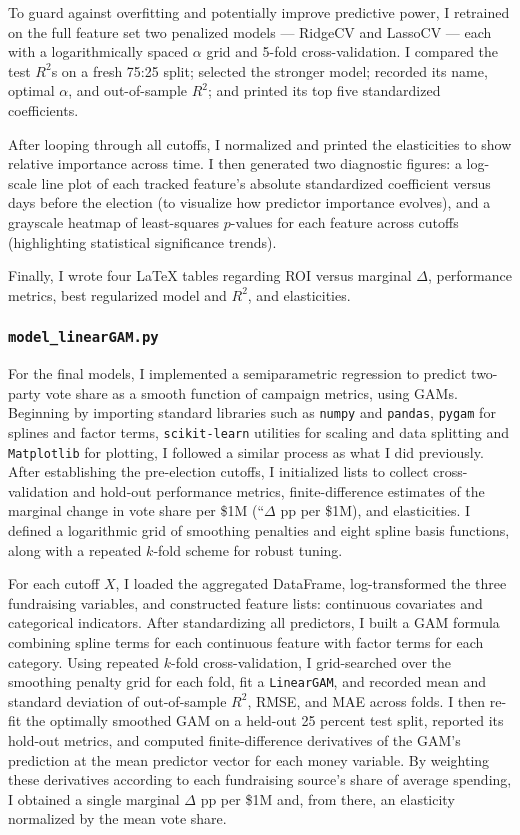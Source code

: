 To guard against overfitting and potentially improve predictive power, I retrained on the full feature set two penalized models --- RidgeCV and LassoCV --- each with a logarithmically spaced $\alpha$ grid and 5-fold cross-validation. I compared the test $R^2$s on a fresh 75:25 split; selected the stronger model; recorded its name, optimal $\alpha$, and out-of-sample $R^2$; and printed its top five standardized coefficients.

After looping through all cutoffs, I normalized and printed the elasticities to show relative importance across time. I then generated two diagnostic figures: a log-scale line plot of each tracked feature's absolute standardized coefficient versus days before the election (to visualize how predictor importance evolves), and a grayscale heatmap of least-squares $p$-values for each feature across cutoffs (highlighting statistical significance trends).

Finally, I wrote four LaTeX tables regarding ROI versus marginal $\Delta$, performance metrics, best regularized model and $R^2$, and elasticities.

\subsubsection*{\tt model\_linearGAM.py}

For the final models, I implemented a semiparametric regression to predict two-party vote share as a smooth function of campaign metrics, using GAMs. Beginning by importing standard libraries such as {\tt numpy} and {\tt pandas}, {\tt pygam} for splines and factor terms, {\tt scikit-learn} utilities for scaling and data splitting and {\tt Matplotlib} for plotting, I followed a similar process as what I did previously. After establishing the pre-election cutoffs, I initialized lists to collect cross-validation and hold-out performance metrics, finite-difference estimates of the marginal change in vote share per \$1M (``$\Delta$ pp per \$1M), and elasticities. I defined a logarithmic grid of smoothing penalties and eight spline basis functions, along with a repeated $k$-fold scheme for robust tuning.

For each cutoff $X$, I loaded the aggregated DataFrame, log-transformed the three fundraising variables, and constructed feature lists: continuous covariates and categorical indicators. After standardizing all predictors, I built a GAM formula combining spline terms for each continuous feature with factor terms for each category. Using repeated $k$-fold cross-validation, I grid-searched over the smoothing penalty grid for each fold, fit a {\tt LinearGAM}, and recorded mean and standard deviation of out-of-sample $R^2$, RMSE, and MAE across folds. I then re-fit the optimally smoothed GAM on a held-out 25 percent test split, reported its hold-out metrics, and computed finite-difference derivatives of the GAM's prediction at the mean predictor vector for each money variable. By weighting these derivatives according to each fundraising source's share of average spending, I obtained a single marginal $\Delta$ pp per \$1M and, from there, an elasticity normalized by the mean vote share.

